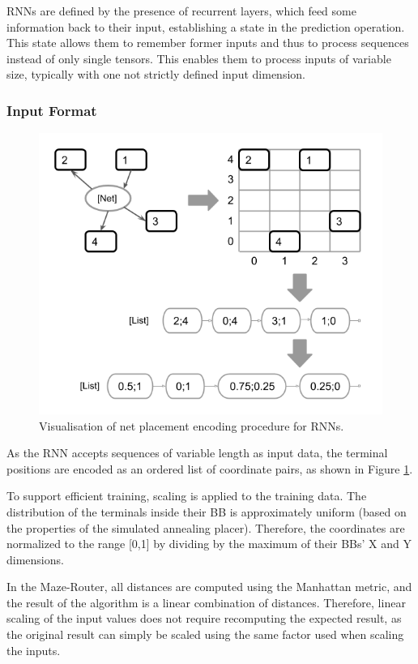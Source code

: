 \glspl{RNN} are defined by the presence of recurrent layers, which feed some information back to their input, establishing a state in the prediction operation. This state allows them to remember former inputs and thus to process sequences instead of only single tensors. This enables them to process inputs of variable size, typically with one not strictly defined input dimension.

\subsubsection{Input Format}

\begin{figure}
	\includegraphics[width=\linewidth]{plots/rnn-encoding-proper.png}
	\caption{Visualisation of net placement encoding procedure for \glspl{RNN}.}
	\label{fig:rnn-encoding}
\end{figure}

As the \gls{RNN} accepts sequences of variable length as input data, the terminal positions are encoded as an ordered list of coordinate pairs, as shown in Figure \ref{fig:rnn-encoding}.

To support efficient training, scaling is applied to the training data. The distribution of the terminals inside their \gls{BB} is approximately uniform (based on the properties of the simulated annealing placer). Therefore, the coordinates are normalized to the range [0,1] by dividing by the maximum of their \glspl{BB}' X and Y dimensions. 

In the Maze-Router, all distances are computed using the Manhattan metric, and the result of the algorithm is a linear combination of distances. Therefore, linear scaling of the input values does not require recomputing the expected result, as the original result can simply be scaled using the same factor used when scaling the inputs.

